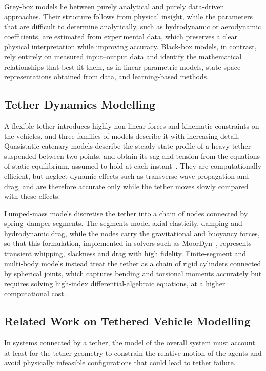 Grey-box models lie between purely analytical and purely data-driven approaches. Their structure follows from physical insight, while the parameters that are difficult to determine analytically, such as hydrodynamic or aerodynamic coefficients, are estimated from experimental data, which preserves a clear physical interpretation while improving accuracy. Black-box models, in contrast, rely entirely on measured input--output data and identify the mathematical relationships that best fit them, as in linear parametric models, state-space representations obtained from data, and learning-based methods.

\subsection{Tether Dynamics Modelling}
\label{subsec:sota_tether_modeling}
A flexible tether introduces highly non-linear forces and kinematic constraints on the vehicles, and three families of models describe it with increasing detail. Quasistatic catenary models describe the steady-state profile of a heavy tether suspended between two points, and obtain its sag and tension from the equations of static equilibrium, assumed to hold at each instant~\cite{irvine1981cable}. They are computationally efficient, but neglect dynamic effects such as transverse wave propagation and drag, and are therefore accurate only while the tether moves slowly compared with these effects.

Lumped-mass models discretise the tether into a chain of nodes connected by spring--damper segments. The segments model axial elasticity, damping and hydrodynamic drag, while the nodes carry the gravitational and buoyancy forces, so that this formulation, implemented in solvers such as MoorDyn~\cite{hall2015moordyn}, represents transient whipping, slackness and drag with high fidelity. Finite-segment and multi-body models instead treat the tether as a chain of rigid cylinders connected by spherical joints, which captures bending and torsional moments accurately but requires solving high-index differential-algebraic equations, at a higher computational cost.

\subsection{Related Work on Tethered Vehicle Modelling}
\label{subsec:sota_sysid_related}
In systems connected by a tether, the model of the overall system must account at least for the tether geometry to constrain the relative motion of the agents and avoid physically infeasible configurations that could lead to tether failure.

